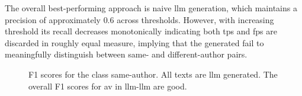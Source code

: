 The overall best-performing approach is naive \ac{llm} generation, which maintains a precision of approximately $0.6$ across thresholds.  
However, with increasing threshold its recall decreases monotonically indicating both \acp{tp} and \acp{fp} are discarded in roughly equal measure, implying that the generated \imps{} fail to meaningfully distinguish between same- and different-author pairs.


  \begin{figure}[b]
    \centering
    
    \caption{F1 scores for the class same-author.
  All texts are \ac{llm} generated.
  The overall F1 scores for \ac{av} in \ac{llm}-\ac{llm} are good.
  }
    \label{fig:llm-llm_f1}
  \end{figure}

